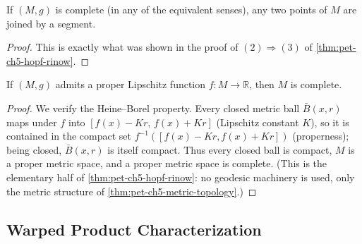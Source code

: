 \begin{corollary}
  \label{cor:pet-ch5-complete-segment-exists}
  If $(M,g)$ is complete (in any of the equivalent senses), any two points of $M$
  are joined by a segment.
\end{corollary}
\begin{proof}
  This is exactly what was shown in the proof of $(2)\Rightarrow(3)$ of
  \cref{thm:pet-ch5-hopf-rinow}.
\end{proof}

\begin{corollary}
  \label{cor:pet-ch5-proper-lipschitz-complete}
  \leanok
  If $(M,g)$ admits a proper Lipschitz function $f:M\to\mathbb R$, then $M$ is
  complete.
\end{corollary}
\begin{proof}
  \leanok
  We verify the Heine–Borel property. Every closed metric ball $\bar B(x,r)$ maps
  under $f$ into $[f(x)-Kr,\,f(x)+Kr]$ (Lipschitz constant $K$), so it is contained
  in the compact set $f^{-1}([f(x)-Kr,f(x)+Kr])$ (properness); being closed, $\bar
  B(x,r)$ is itself compact. Thus every closed ball is compact, $M$ is a proper
  metric space, and a proper metric space is complete. (This is the elementary half
  of \cref{thm:pet-ch5-hopf-rinow}: no geodesic machinery is used, only the metric
  structure of \cref{thm:pet-ch5-metric-topology}.)
\end{proof}

\subsection{Warped Product Characterization}

